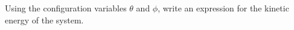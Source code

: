 Using the configuration variables $\theta$ and $\phi$, write an expression for the kinetic energy of the system.
